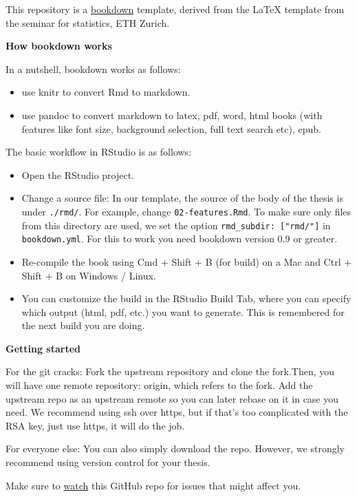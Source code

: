 \documentclass[11pt,a4paper,twoside,openright]{report}
\theoremstyle{definition}
\numberwithin{equation}{subsection}
\providecommand{\tightlist}{%
  \setlength{\itemsep}{0pt}\setlength{\parskip}{0pt}}
\begin{document}
This repository is a \href{https://github.com/rstudio/bookdown}{bookdown} template,
derived from the LaTeX template from the seminar for statistics, ETH Zurich.

\textbf{How bookdown works}

In a nutshell, bookdown works as follows:

\begin{itemize}
\tightlist
\item
  use knitr to convert Rmd to markdown.
\item
  use pandoc to convert markdown to latex, pdf, word, html books (with features
  like font size, background selection, full text search etc), epub.
\end{itemize}

The basic workflow in RStudio is as follows:

\begin{itemize}
\tightlist
\item
  Open the RStudio project.
\item
  Change a source file: In our template, the source of the body of the thesis
  is under \texttt{./rmd/}. For example, change \texttt{02-features.Rmd}. To make sure only
  files from this directory are used, we set the option \texttt{rmd\_subdir:\ {[}"rmd/"{]}}
  in \texttt{bookdown.yml}. For this to work you need bookdown version 0.9 or greater.
\item
  Re-compile the book using Cmd + Shift + B (for build) on a Mac and Ctrl +
  Shift + B on Windows / Linux.
\item
  You can customize the build in the RStudio Build Tab, where you can specify
  which output (html, pdf, etc.) you want to generate. This is remembered for the
  next build you are doing.
\end{itemize}

\textbf{Getting started}

For the git cracks: Fork the upstream repository and clone the fork.Then, you will have one remote
repository: origin, which refers to the fork. Add the upstream repo as an
upstream remote so you can later rebase on it in case you need. We recommend
using ssh over https, but if that's too complicated with the RSA key, just
use https, it will do the job.

For everyone else: You can also simply download the repo.
However, we strongly recommend using version control for your thesis.

Make sure to \href{https://help.github.com/en/articles/watching-and-unwatching-repositories}{watch}
this GitHub repo for issues that might affect you.
\end{document}

